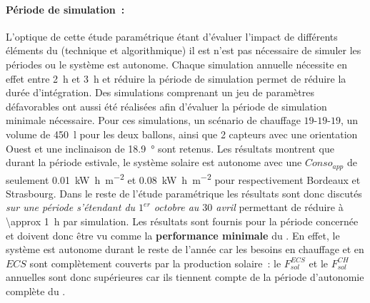 \paragraph{Période de simulation~:} %
\label{par:periode_de_simulation}
L’optique de cette étude paramétrique étant d’évaluer l’impact de différents éléments du
 (technique et algorithmique) il est n’est pas nécessaire de simuler les périodes ou
le système est autonome. Chaque simulation annuelle nécessite en effet entre
\SI{2}{\hour} et \SI{3}{\hour} et réduire la période de simulation permet de réduire la durée
d’intégration. Des simulations comprenant un jeu de paramètres défavorables ont aussi été
réalisées afin d’évaluer la période de simulation minimale nécessaire. Pour ces
simulations, un scénario de chauffage $19$-$19$-$19$, un volume de \SI{450}{\litre} pour les
deux ballons, ainsi que \num{2} capteurs avec une orientation Ouest et une inclinaison de
\SI{18.9}{\degree} sont retenus. Les résultats montrent que durant la
période estivale, le système solaire est autonome avec une $Conso_{app}$ de seulement
\SI[per-mode=symbol]{0.01}{\kilo\watt\hour\per\metre\squared} et
\SI[per-mode=symbol]{0.08}{\kilo\watt\hour\per\metre\squared}
pour respectivement Bordeaux et Strasbourg. Dans le reste de l’étude paramétrique
les résultats sont donc discutés \emph{sur une période s’étendant du $1^{er}$
octobre au $30$ avril} permettant de réduire à \SI{\approx 1}{\hour} par simulation. Les
résultats sont fournis pour la période concernée et doivent donc être vu comme la
\textbf{performance minimale} du . En effet, le système est autonome durant le reste
de l’année car les besoins en chauffage et en $ECS$ sont complètement couverts par la
production solaire~: le $F_{sol}^{ECS}$ et le $F_{sol}^{CH}$ annuelles sont donc
supérieures car ils tiennent compte de la période d’autonomie complète du .




